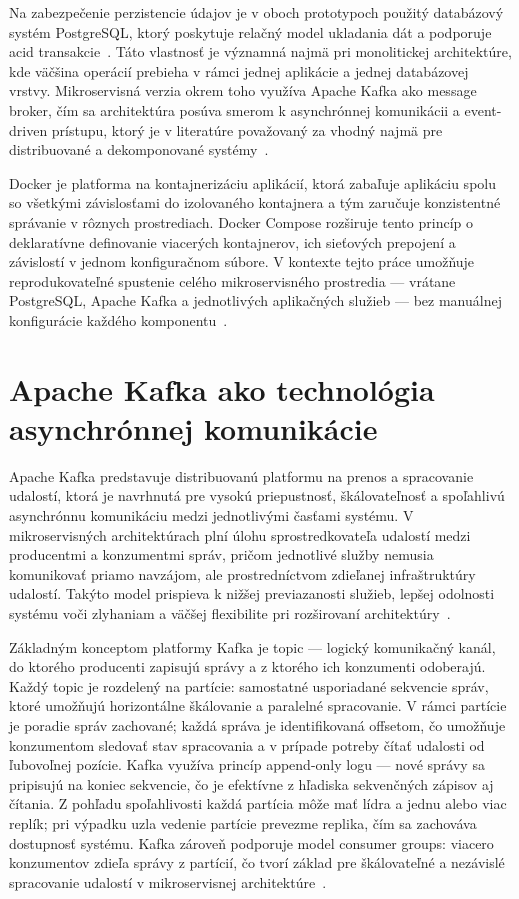 Na zabezpečenie perzistencie údajov je v oboch prototypoch použitý databázový systém PostgreSQL, ktorý poskytuje relačný model ukladania dát a podporuje \acrshort{acid} transakcie~\cite{PostgreSQLDocs2025}. Táto vlastnosť je významná najmä pri monolitickej architektúre, kde väčšina operácií prebieha v rámci jednej aplikácie a jednej databázovej vrstvy. Mikroservisná verzia okrem toho využíva Apache Kafka ako message broker, čím sa architektúra posúva smerom k asynchrónnej komunikácii a event-driven prístupu, ktorý je v literatúre považovaný za vhodný najmä pre distribuované a dekomponované systémy~\cite{Richardson2018}.

Docker je platforma na kontajnerizáciu aplikácií, ktorá zabaľuje aplikáciu spolu so všetkými závislosťami do izolovaného kontajnera a tým zaručuje konzistentné správanie v rôznych prostrediach. Docker Compose rozširuje tento princíp o deklaratívne definovanie viacerých kontajnerov, ich sieťových prepojení a závislostí v jednom konfiguračnom súbore. V kontexte tejto práce umožňuje reprodukovateľné spustenie celého mikroservisného prostredia — vrátane PostgreSQL, Apache Kafka a jednotlivých aplikačných služieb — bez manuálnej konfigurácie každého komponentu~\cite{Merkel2014Docker,DockerCompose2025}.

\section{Apache Kafka ako technológia asynchrónnej komunikácie}

Apache Kafka predstavuje distribuovanú platformu na prenos a spracovanie udalostí, ktorá je navrhnutá pre vysokú priepustnosť, škálovateľnosť a spoľahlivú asynchrónnu komunikáciu medzi jednotlivými časťami systému. V mikroservisných architektúrach plní úlohu sprostredkovateľa udalostí medzi producentmi a konzumentmi správ, pričom jednotlivé služby nemusia komunikovať priamo navzájom, ale prostredníctvom zdieľanej infraštruktúry udalostí. Takýto model prispieva k nižšej previazanosti služieb, lepšej odolnosti systému voči zlyhaniam a väčšej flexibilite pri rozširovaní architektúry~\cite{KafkaDocs2025}.

Základným konceptom platformy Kafka je topic — logický komunikačný kanál, do ktorého producenti zapisujú správy a z ktorého ich konzumenti odoberajú. Každý topic je rozdelený na partície: samostatné usporiadané sekvencie správ, ktoré umožňujú horizontálne škálovanie a paralelné spracovanie. V rámci partície je poradie správ zachované; každá správa je identifikovaná offsetom, čo umožňuje konzumentom sledovať stav spracovania a v prípade potreby čítať udalosti od ľubovoľnej pozície. Kafka využíva princíp append-only logu — nové správy sa pripisujú na koniec sekvencie, čo je efektívne z hľadiska sekvenčných zápisov aj čítania. Z pohľadu spoľahlivosti každá partícia môže mať lídra a jednu alebo viac replík; pri výpadku uzla vedenie partície prevezme replika, čím sa zachováva dostupnosť systému. Kafka zároveň podporuje model consumer groups: viacero konzumentov zdieľa správy z partícií, čo tvorí základ pre škálovateľné a nezávislé spracovanie udalostí v mikroservisnej architektúre~\cite{KafkaDocs2025}.


